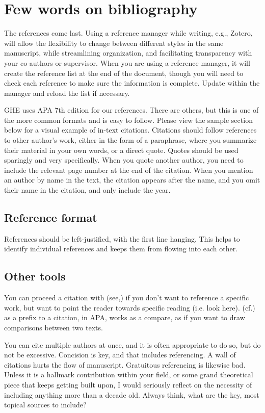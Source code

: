 \cleardoublepage%
\chapter{\label{chap:bib_des}Few words on bibliography}%

The references come last. Using a reference manager while writing, e.g., Zotero, will allow the flexibility to change between different styles in the same manuscript, while streamlining organization, and facilitating transparency with your co-authors or supervisor. When you are using a reference manager, it will create the reference list at the end of the document, though you will need to check each reference to make sure the information is complete. Update within the manager and reload the list if necessary.

GHE uses APA 7th edition for our references. There are others, but this is one of the more common formats and is easy to follow. Please view the sample section below for a visual example of in-text citations. Citations should follow references to other author’s work, either in the form of a paraphrase, where you summarize their material in your own words, or a direct quote. Quotes should be used sparingly and very specifically. When you quote another author, you need to include the relevant page number at the end of the citation. When you mention an author by name in the text, the citation appears after the name, and you omit their name in the citation, and only include the year.

\section{\label{sec:bib_des_format}Reference format}

References should be left-justified, with the first line hanging. This helps to identify individual references and keeps them from flowing into each other.

\section{\label{sec:bib_tools}Other tools}

You can proceed a citation with (see,) if you don’t want to reference a specific work, but want to point the reader towards specific reading (i.e. look here). (cf.) as a prefix to a citation, in APA, works as a compare, as if you want to draw comparisons between two texts.

You can cite multiple authors at once, and it is often appropriate to do so, but do not be excessive. Concision is key, and that includes referencing. A wall of citations hurts the flow of manuscript. Gratuitous referencing is likewise bad. Unless it is a hallmark contribution within your field, or some grand theoretical piece that keeps getting built upon, I would seriously reflect on the necessity of including anything more than a decade old. Always think, what are the key, most topical sources to include? 
 
